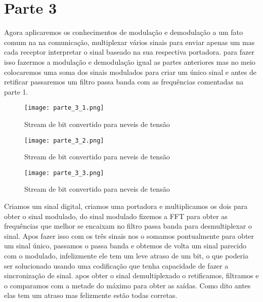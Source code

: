 \documentclass{article}
\begin{document}
     \section{Parte 3}
        Agora aplicaremos os conhecimentos de modulação e demodulação a um fato comum na na comunicação, multiplexar vários sinais para enviar apenas um mas cada receptor interpretar o sinal baseado na sua respectiva portadora. para fazer isso fazermos a modulação e demodulação igual as partes anteriores mas no meio colocaremos uma soma dos sinais modulados para criar um único sinal e antes de retificar passaremos um filtro passa banda com as frequências comentadas na parte 1.
        \begin{figure}[H]
            \begin{center}
                \texttt{[image: parte\_3\_1.png]}
                \caption{Stream de bit convertido para neveis de tensão}
                \label{fig:Stream de bits convertido}
            \end{center}
        \end{figure}
        \begin{figure}[H]
            \begin{center}
                \texttt{[image: parte\_3\_2.png]}
                \caption{Stream de bit convertido para neveis de tensão}
                \label{fig:Stream de bits convertido}
            \end{center}
        \end{figure}
        \begin{figure}[H]
            \begin{center}
                \texttt{[image: parte\_3\_3.png]}
                \caption{Stream de bit convertido para neveis de tensão}
                \label{fig:Stream de bits convertido}
            \end{center}
        \end{figure}
        Criamos um sinal digital, criamos uma portadora e multiplicamos os dois para obter o sinal modulado, do sinal modulado fizemos a FFT para obter as frequências que melhor se encaixam no filtro passa banda para desmultiplexar o sinal. Apos fazer isso com os três sinais nos o somamos pontualmente para obter um sinal único, passamos o passa banda e obtemos de volta um sinal parecido com o modulado, infelizmente ele tem um leve atraso de um bit, o que poderia ser solucionado usando uma codificação que tenha capacidade de fazer a sincronização de sinal. apos obter o sinal demultiplexado o retificamos, filtramos e o comparamos com a metade do máximo para obter as saídas. Como dito antes elas tem um atraso mas felizmente estão todas corretas.
\end{document}
